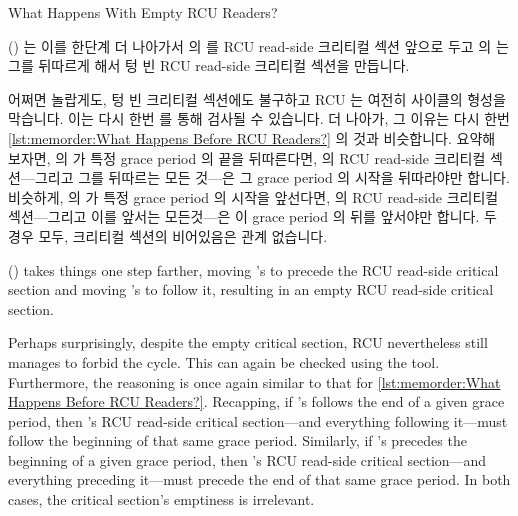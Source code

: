 \fi

\begin{listing}[tbp]

\caption{What Happens With Empty RCU Readers?}
\label{lst:memorder:What Happens With Empty RCU Readers?}
\end{listing}

()
는 이를 한단계 더 나아가서  의  를 RCU read-side
크리티컬 섹션 앞으로 두고  의  는 그를 뒤따르게 해서
텅 빈 RCU read-side 크리티컬 섹션을 만듭니다.

어쩌면 놀랍게도, 텅 빈 크리티컬 섹션에도 불구하고 RCU 는 여전히 사이클의 형성을
막습니다.
이는 다시 한번  를 통해 검사될 수 있습니다.
더 나아가, 그 이유는 다시 한번
\cref{lst:memorder:What Happens Before RCU Readers?} 의 것과 비슷합니다.
요약해 보자면,  의  가 특정 grace period 의 끝을
뒤따른다면,  의 RCU read-side 크리티컬 섹션---그리고 그를 뒤따르는
모든 것---은 그 grace period 의 시작을 뒤따라야만 합니다.
비슷하게,  의  가 특정 grace period 의 시작을
앞선다면,  의 RCU read-side 크리티컬 섹션---그리고 이를 앞서는
모든것---은 이 grace period 의 뒤를 앞서야만 합니다.
두 경우 모두, 크리티컬 섹션의 비어있음은 관계 없습니다.

\iffalse

()
takes things one step farther, moving 's 
to precede the RCU read-side critical section and moving
's  to follow it, resulting in an
empty RCU read-side critical section.

Perhaps surprisingly, despite the empty critical section, RCU nevertheless
still manages to forbid the cycle.
This can again be checked using the  tool.
Furthermore, the reasoning is once again similar to that for
\cref{lst:memorder:What Happens Before RCU Readers?}.
Recapping, if 's  follows the end of a given
grace period, then 's RCU read-side critical section---and
everything following it---must follow the beginning of that same grace
period.
Similarly, if 's  precedes the beginning of a
given grace period, then 's RCU read-side critical section---and
everything preceding it---must precede the end of that same grace period.
In both cases, the critical section's emptiness is irrelevant.

